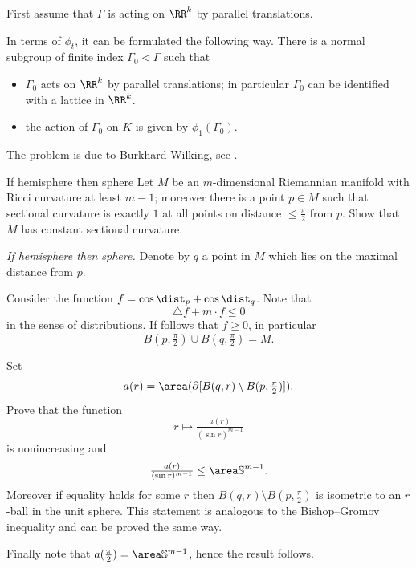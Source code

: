 First assume that $\Gamma$ is acting on $\RR^k$ by parallel translations.
 




In terms of $\phi_t$, it can be formulated the following way.
There is a normal subgroup of finite index $\Gamma_0\vartriangleleft\Gamma$ such that 
\begin{itemize}
\item $\Gamma_0$ acts on $\RR^k$ by parallel translations; 
in particular $\Gamma_0$ can be identified with a lattice in $\RR^k$.
\item the action of $\Gamma_0$ on $K$ is given by $\phi_1(\Gamma_0)$.
\end{itemize}


The problem is due to Burkhard Wilking, see \cite{wilking-2000}.














\begin{pr}{\thm}{If hemisphere then sphere}\label{hS=>S} 
Let $M$ be an $m$-dimensional Riemannian manifold with Ricci curvature at least $m-1$;
moreover there is a point $p\in M$ such that sectional curvature is exactly $1$ at all points on distance $\le \tfrac\pi2$ from $p$.
Show that $M$ has constant sectional curvature.
\end{pr}

\textit{If hemisphere then sphere.}
Denote by $q$ a point in $M$ which lies on the maximal distance from $p$.

Consider the function $f=\cos \dist_p+\cos\dist_q$.
Note that 
\[\triangle f+m\cdot f\le 0\] 
in the sense of distributions.
If follows that $f\ge 0$, in particular 
\[B(p,\tfrac\pi2)\cup B(q,\tfrac\pi2)=M.\]

Set \[a(r)=\area(\partial [B(q,r)\setminus B(p,\tfrac\pi2)]).\]
Prove that the function
\[r \mapsto \tfrac{a(r)}{(\sin r)^{m-1}}\]
is nonincreasing 
and 
\[\tfrac{a(r)}{(\sin r)^{m-1}}\le\area\mathbb{S}^{m-1}.\]
Moreover if equality holds for some $r$ then $B(q,r)\setminus B(p,\tfrac\pi2)$ is isometric to an $r$-ball in the unit sphere.
This statement is analogous to the Bishop--Gromov inequality and can be proved the same way.

Finally note that $a(\tfrac\pi2)=\area\mathbb{S}^{m-1}$,
hence the result follows.
 

